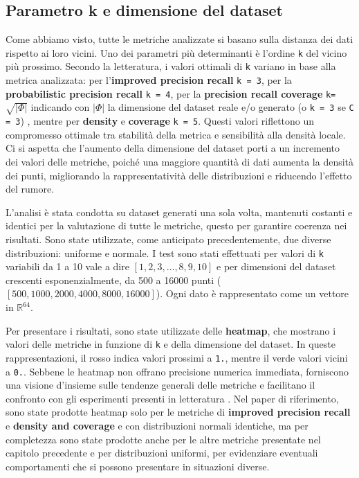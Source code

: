 \subsection{Parametro k e dimensione del dataset}
\label{subsec:k-dataset-dimension}

Come abbiamo visto, tutte le metriche analizzate si basano sulla distanza dei dati rispetto ai loro vicini. Uno dei parametri più determinanti è l'ordine \texttt{k} del vicino più prossimo. Secondo la letteratura, i valori ottimali di \texttt{k} variano in base alla metrica analizzata: per l’\textbf{improved precision recall} \texttt{k = 3}, per la \textbf{probabilistic precision recall} \texttt{k = 4}, per la \textbf{precision recall coverage} \texttt{k=\(\sqrt{|\Phi|}\)} indicando con \(|\Phi|\) la dimensione del dataset reale e/o generato (o \texttt{k = 3} se \texttt{C = 3})
, mentre per \textbf{density} e \textbf{coverage} \texttt{k = 5}. Questi valori riflettono un compromesso ottimale tra stabilità della metrica e sensibilità alla densità locale. Ci si aspetta che l'aumento della dimensione del dataset porti a un incremento dei valori delle metriche, poiché una maggiore quantità di dati aumenta la densità dei punti, migliorando la rappresentatività delle distribuzioni e riducendo l’effetto del rumore.

L'analisi è stata condotta su dataset generati una sola volta, mantenuti costanti e identici per la valutazione di tutte le metriche, questo per garantire coerenza nei risultati. Sono state utilizzate, come anticipato precedentemente, due diverse distribuzioni: uniforme e normale. I test sono stati effettuati per valori di \texttt{k} variabili da 1 a 10 vale a dire \([1,2,3,\dots,8,9,10]\) e per dimensioni del dataset crescenti esponenzialmente, da 500 a 16000 punti (\([500,1000,2000,4000,8000,16000]\)). Ogni dato è rappresentato come un vettore in \(\mathbb{R}^{64}\).

Per presentare i risultati, sono state utilizzate delle \textbf{heatmap}, che mostrano i valori delle metriche in funzione di \texttt{k} e della dimensione del dataset. In queste rappresentazioni, il rosso indica valori prossimi a \texttt{1.}, mentre il verde valori vicini a \texttt{0.}. Sebbene le heatmap non offrano precisione numerica immediata, forniscono una visione d’insieme sulle tendenze generali delle metriche e facilitano il confronto con gli esperimenti presenti in letteratura \cite{3ReliableFidelityDiversityMetrics}. Nel paper di riferimento, sono state prodotte heatmap solo per le metriche di \textbf{improved precision recall} e \textbf{density and coverage} e con distribuzioni normali identiche, ma per completezza sono state prodotte anche per le altre metriche presentate nel capitolo precedente e per distribuzioni uniformi, per evidenziare eventuali comportamenti che si possono presentare in situazioni diverse.

